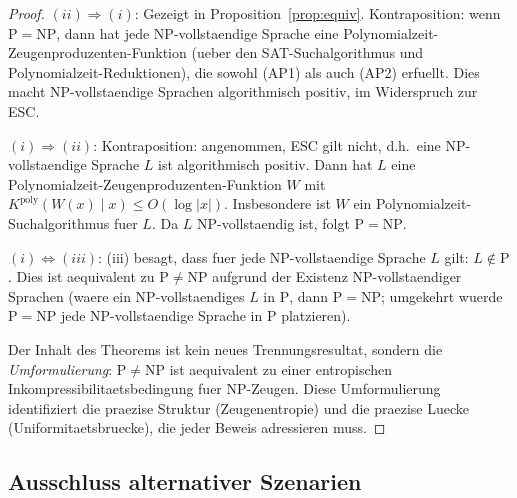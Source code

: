 \documentclass[aps,prd,twocolumn,superscriptaddress,nofootinbib]{revtex4-2}
\theoremstyle{definition}
\theoremstyle{remark}
\DeclareMathOperator{\poly}{poly}
\newcommand{\NP}{\mathrm{NP}}
\newcommand{\PP}{\mathrm{P}}
\begin{document}
\begin{proof}
$(ii) \Rightarrow (i)$: Gezeigt in Proposition~\ref{prop:equiv}. Kontraposition: wenn $\PP = \NP$, dann hat jede NP-vollstaendige Sprache eine Polynomialzeit-Zeugenproduzenten-Funktion (ueber den SAT-Suchalgorithmus und Polynomialzeit-Reduktionen), die sowohl (AP1) als auch (AP2) erfuellt. Dies macht NP-vollstaendige Sprachen algorithmisch positiv, im Widerspruch zur ESC.

$(i) \Rightarrow (ii)$: Kontraposition: angenommen, ESC gilt nicht, d.h.\ eine NP-vollstaendige Sprache $L$ ist algorithmisch positiv. Dann hat $L$ eine Polynomialzeit-Zeugenproduzenten-Funktion $W$ mit $K^{\poly}(W(x) \mid x) \leq O(\log|x|)$. Insbesondere ist $W$ ein Polynomialzeit-Suchalgorithmus fuer $L$. Da $L$ NP-vollstaendig ist, folgt $\PP = \NP$.

$(i) \Leftrightarrow (iii)$: (iii) besagt, dass fuer jede NP-vollstaendige Sprache $L$ gilt: $L \notin \PP$. Dies ist aequivalent zu $\PP \neq \NP$ aufgrund der Existenz NP-vollstaendiger Sprachen (waere ein NP-vollstaendiges $L$ in $\PP$, dann $\PP = \NP$; umgekehrt wuerde $\PP = \NP$ jede NP-vollstaendige Sprache in $\PP$ platzieren).

Der Inhalt des Theorems ist kein neues Trennungsresultat, sondern die \textit{Umformulierung}: $\PP \neq \NP$ ist aequivalent zu einer entropischen Inkompressibilitaetsbedingung fuer NP-Zeugen. Diese Umformulierung identifiziert die praezise Struktur (Zeugenentropie) und die praezise Luecke (Uniformitaetsbruecke), die jeder Beweis adressieren muss.
\end{proof}

\subsection{Ausschluss alternativer Szenarien}
\end{document}
